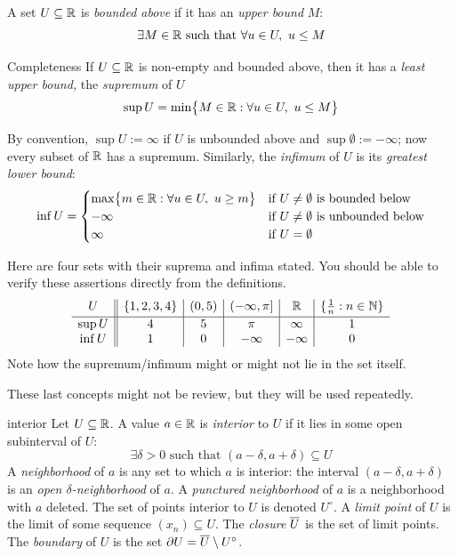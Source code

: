 \goodbreak



A set $U\subseteq\mathbb{R}$ is \emph{bounded above} if it has an \emph{upper bound} $M$:
\[
	\exists M\in\mathbb{R}\text{ such that }\forall u\in U,\ u\le M
\]


\begin{axiom}{Completeness}{}
	If $U\subseteq\mathbb{R}$ is non-empty and bounded above, then it has a \emph{least upper bound,} the \emph{supremum} of $U$
	\[
		\sup U=\min\bigl\{M\in\R:\forall u\in U,\ u\le M\bigr\}
	\]
\end{axiom}

By convention, $\sup U:=\infty$ if $U$ is unbounded above and $\sup\emptyset:=-\infty$; now every subset of $\mathbb{R}$ has a supremum. Similarly, the \emph{infimum} of $U$ is its \emph{greatest lower bound}:
	\[
		\inf U=
		\begin{cases}
			\max\bigl\{m\in\mathbb{R}:\forall u\in U,\ u\ge m\bigr\} &\text{if $U\neq\emptyset$ is bounded below}\\
			-\infty&\text{if $U\neq\emptyset$ is unbounded below}\\
			\infty&\text{if $U=\emptyset$}
		\end{cases}
	\]
	
\begin{examples}{}{}
	Here are four sets with their suprema and infima stated. You should be able to verify these assertions directly from the definitions.
	\[
		\begin{array}{c||c|c|c|c|c}
			U&\{1,2,3,4\}&(0,5)&(-\infty,\pi]&\mathbb{R}&\{\frac 1n:n\in\mathbb{N}\}\\[2pt]\hline
			\sup U&4&5&\pi&\infty&1\\
			\inf U&1&0&-\infty&-\infty&0
		\end{array}
	\]
	Note how the supremum/infimum might or might not lie in the set itself.
\end{examples}



These last concepts might not be review, but they will be used repeatedly.

\begin{defn}{}{interior}
	Let $U\subseteq\mathbb{R}$. A value $a\in\mathbb{R}$ is \emph{interior} to $U$ if it lies in some open subinterval of $U$:
	\[
		\exists\delta>0\text{ such that }(a-\delta,a+\delta)\subseteq U
	\]
	A \emph{neighborhood} of $a$ is any set to which $a$ is interior: the interval $(a-\delta,a+\delta)$ is an \emph{open $\delta$-neighborhood} of $a$. A \emph{punctured neighborhood} of $a$ is a neighborhood with $a$ deleted.\smallbreak
	The set of points interior to $U$ is denoted $U^\circ$.\smallbreak
	A \emph{limit point} of $U$ is the limit of some sequence $(x_n)\subseteq U$. The \emph{closure} $\overline{U}$ is the set of limit points.\smallbreak
	The \emph{boundary} of $U$ is the set $\partial U=\overline{U}\setminus U^\circ$.
\end{defn}

